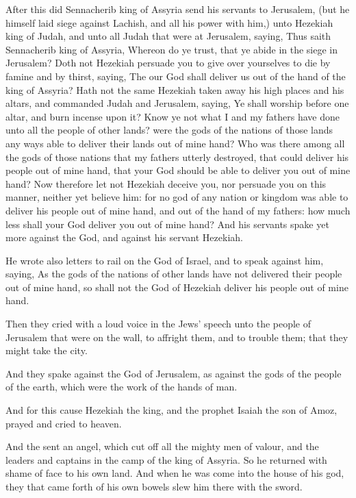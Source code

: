 \Verse After this did Sennacherib king of Assyria send his servants to Jerusalem, (but he himself laid siege against Lachish, and all his power with him,) unto Hezekiah king of Judah, and unto all Judah that were at Jerusalem, saying, \Verse Thus saith Sennacherib king of Assyria, Whereon do ye trust, that ye abide in the siege in Jerusalem?  \Verse Doth not Hezekiah persuade you to give over yourselves to die by famine and by thirst, saying, The \LORD our God shall deliver us out of the hand of the king of Assyria?  \Verse Hath not the same Hezekiah taken away his high places and his altars, and commanded Judah and Jerusalem, saying, Ye shall worship before one altar, and burn incense upon it?  \Verse Know ye not what I and my fathers have done unto all the people of other lands? were the gods of the nations of those lands any ways able to deliver their lands out of mine hand?  \Verse Who was there among all the gods of those nations that my fathers utterly destroyed, that could deliver his people out of mine hand, that your God should be able to deliver you out of mine hand?  \Verse Now therefore let not Hezekiah deceive you, nor persuade you on this manner, neither yet believe him: for no god of any nation or kingdom was able to deliver his people out of mine hand, and out of the hand of my fathers: how much less shall your God deliver you out of mine hand?  \Verse And his servants spake yet more against the \LORD God, and against his servant Hezekiah.

\Verse He wrote also letters to rail on the \LORD God of Israel, and to speak against him, saying, As the gods of the nations of other lands have not delivered their people out of mine hand, so shall not the God of Hezekiah deliver his people out of mine hand.

\Verse Then they cried with a loud voice in the Jews' speech unto the people of Jerusalem that were on the wall, to affright them, and to trouble them; that they might take the city.

\Verse And they spake against the God of Jerusalem, as against the gods of the people of the earth, which were the work of the hands of man.

\Verse And for this cause Hezekiah the king, and the prophet Isaiah the son of Amoz, prayed and cried to heaven.

\Verse And the \LORD sent an angel, which cut off all the mighty men of valour, and the leaders and captains in the camp of the king of Assyria. So he returned with shame of face to his own land. And when he was come into the house of his god, they that came forth of his own bowels slew him there with the sword.


